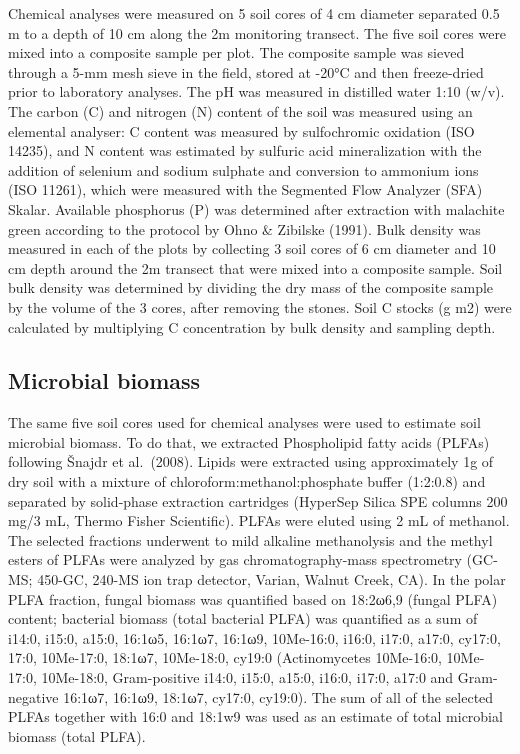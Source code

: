 \documentclass[
]{article}
\begin{document}
Chemical analyses were measured on 5 soil cores of 4 cm diameter separated 0.5 m to a depth of 10 cm along the 2m monitoring transect. The five soil cores were mixed into a composite sample per plot. The composite sample was sieved through a 5-mm mesh sieve in the field, stored at -20°C and then freeze-dried prior to laboratory analyses. The pH was measured in distilled water 1:10 (w/v). The carbon (C) and nitrogen (N) content of the soil was measured using an elemental analyser: C content was measured by sulfochromic oxidation (ISO 14235), and N content was estimated by sulfuric acid mineralization with the addition of selenium and sodium sulphate and conversion to ammonium ions (ISO 11261), which were measured with the Segmented Flow Analyzer (SFA) Skalar. Available phosphorus (P) was determined after extraction with malachite green according to the protocol by Ohno \& Zibilske (1991). Bulk density was measured in each of the plots by collecting 3 soil cores of 6 cm diameter and 10 cm depth around the 2m transect that were mixed into a composite sample. Soil bulk density was determined by dividing the dry mass of the composite sample by the volume of the 3 cores, after removing the stones. Soil C stocks (g m2) were calculated by multiplying C concentration by bulk density and sampling depth.

\subsection{Microbial biomass}\label{microbial-biomass}

The same five soil cores used for chemical analyses were used to estimate soil microbial biomass. To do that, we extracted Phospholipid fatty acids (PLFAs) following Šnajdr et al.~(2008). Lipids were extracted using approximately 1g of dry soil with a mixture of chloroform:methanol:phosphate buffer (1:2:0.8) and separated by solid-phase extraction cartridges (HyperSep Silica SPE columns 200 mg/3 mL, Thermo Fisher Scientific). PLFAs were eluted using 2 mL of methanol. The selected fractions underwent to mild alkaline methanolysis and the methyl esters of PLFAs were analyzed by gas chromatography-mass spectrometry (GC-MS; 450-GC, 240-MS ion trap detector, Varian, Walnut Creek, CA). In the polar PLFA fraction, fungal biomass was quantified based on 18:2ω6,9 (fungal PLFA) content; bacterial biomass (total bacterial PLFA) was quantified as a sum of i14:0, i15:0, a15:0, 16:1ω5, 16:1ω7, 16:1ω9, 10Me-16:0, i16:0, i17:0, a17:0, cy17:0, 17:0, 10Me-17:0, 18:1ω7, 10Me-18:0, cy19:0 (Actinomycetes 10Me-16:0, 10Me-17:0, 10Me-18:0, Gram-positive i14:0, i15:0, a15:0, i16:0, i17:0, a17:0 and Gram-negative 16:1ω7, 16:1ω9, 18:1ω7, cy17:0, cy19:0). The sum of all of the selected PLFAs together with 16:0 and 18:1w9 was used as an estimate of total microbial biomass (total PLFA).
\end{document}
